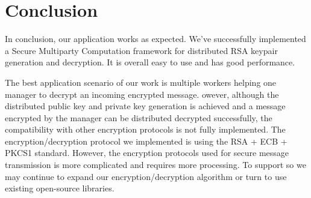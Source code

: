 \chapter{Conclusion}

In conclusion, our application works as expected. We’ve successfully implemented a Secure  Multiparty Computation framework for distributed RSA keypair generation and decryption. It is overall easy to use and has good performance.

The best application scenario of our work is multiple workers helping one manager to decrypt an incoming encrypted message. owever, although the distributed public key and private key generation is achieved and a message encrypted by the manager can be distributed decrypted successfully, the compatibility with other encryption protocols is not fully implemented. The encryption/decryption protocol we implemented is using the RSA + ECB + PKCS1 standard. However, the encryption protocols used for secure message transmission is more complicated and requires more processing. To support so we may continue to expand our encryption/decryption algorithm or turn to use existing open-source libraries.
